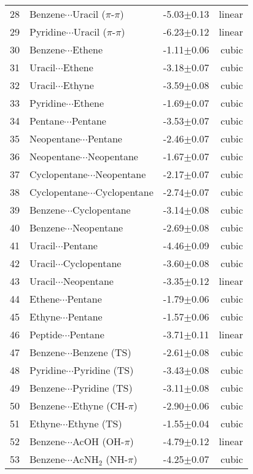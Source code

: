 \begin{longtable}{llrr}
28 & Benzene$\cdots$Uracil ($\pi$-$\pi$) & -5.03$\pm$0.13 & linear \\
29 & Pyridine$\cdots$Uracil ($\pi$-$\pi$) & -6.23$\pm$0.12 & linear \\
30 & Benzene$\cdots$Ethene & -1.11$\pm$0.06 & cubic \\
31 & Uracil$\cdots$Ethene & -3.18$\pm$0.07 & cubic \\
32 & Uracil$\cdots$Ethyne & -3.59$\pm$0.08 & cubic \\
33 & Pyridine$\cdots$Ethene & -1.69$\pm$0.07 & cubic \\
34 & Pentane$\cdots$Pentane & -3.53$\pm$0.07 & cubic \\
35 & Neopentane$\cdots$Pentane & -2.46$\pm$0.07 & cubic \\
36 & Neopentane$\cdots$Neopentane & -1.67$\pm$0.07 & cubic \\
37 & Cyclopentane$\cdots$Neopentane & -2.17$\pm$0.07 & cubic \\
38 & Cyclopentane$\cdots$Cyclopentane & -2.74$\pm$0.07 & cubic \\
39 & Benzene$\cdots$Cyclopentane & -3.14$\pm$0.08 & cubic \\
40 & Benzene$\cdots$Neopentane & -2.69$\pm$0.08 & cubic \\
41 & Uracil$\cdots$Pentane & -4.46$\pm$0.09 & cubic \\
42 & Uracil$\cdots$Cyclopentane & -3.60$\pm$0.08 & cubic \\
43 & Uracil$\cdots$Neopentane & -3.35$\pm$0.12 & linear \\
44 & Ethene$\cdots$Pentane & -1.79$\pm$0.06 & cubic \\
45 & Ethyne$\cdots$Pentane & -1.57$\pm$0.06 & cubic \\
46 & Peptide$\cdots$Pentane & -3.71$\pm$0.11 & linear \\
47 & Benzene$\cdots$Benzene (TS) & -2.61$\pm$0.08 & cubic \\
48 & Pyridine$\cdots$Pyridine (TS) & -3.43$\pm$0.08 & cubic \\
49 & Benzene$\cdots$Pyridine (TS) & -3.11$\pm$0.08 & cubic \\
50 & Benzene$\cdots$Ethyne (CH-$\pi$) & -2.90$\pm$0.06 & cubic \\
51 & Ethyne$\cdots$Ethyne (TS) & -1.55$\pm$0.04 & cubic \\
52 & Benzene$\cdots$AcOH (OH-$\pi$) & -4.79$\pm$0.12 & linear \\
53 & Benzene$\cdots$AcNH$_2$ (NH-$\pi$) & -4.25$\pm$0.07 & cubic \\

\end{longtable}
